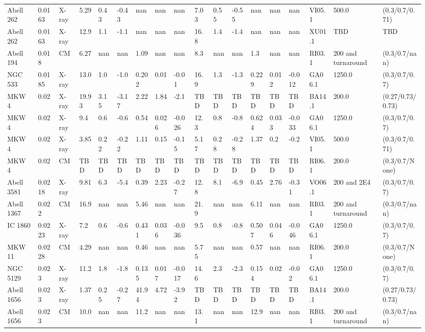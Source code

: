 \documentclass{article}
\begin{document}
\begin{center}
\begin{landscape}
\begin{longtable}{llllllllllllllllll}
Abell 262 & 0.0163 & X-ray & 5.29 & 0.43 & -0.43 & nan & nan & nan & 7.03 & 0.55 & -0.55 & nan & nan & nan & VI05.1 & 500.0 & (0.3/0.7/0.71) \\
Abell 262 & 0.0163 & X-ray & 12.9 & 1.1 & -1.1 & nan & nan & nan & 16.8 & 1.4 & -1.4 & nan & nan & nan & XU01.1 & TBD & TBD \\
Abell 194 & 0.018 & CM & 6.27 & nan & nan & 1.09 & nan & nan & 8.3 & nan & nan & 1.3 & nan & nan & RI03.1 & 200 and turnaround & (0.3/0.7/nan) \\
NGC 533 & 0.0185 & X-ray & 13.0 & 1.0 & -1.0 & 0.202 & 0.01 & -0.01 & 16.9 & 1.3 & -1.3 & 0.229 & 0.012 & -0.012 & GA06.1 & 1250.0 & (0.3/0.7/0.7) \\
MKW 4 & 0.02 & X-ray & 19.93 & 3.15 & -3.17 & 2.22 & 1.84 & -2.1 & TBD & TBD & TBD & TBD & TBD & TBD & BA14.1 & 200.0 & (0.27/0.73/0.73) \\
MKW 4 & 0.02 & X-ray & 9.4 & 0.6 & -0.6 & 0.54 & 0.026 & -0.026 & 12.3 & 0.8 & -0.8 & 0.624 & 0.033 & -0.033 & GA06.1 & 1250.0 & (0.3/0.7/0.7) \\
MKW 4 & 0.02 & X-ray & 3.85 & 0.22 & -0.22 & 1.11 & 0.15 & -0.15 & 5.17 & 0.28 & -0.28 & 1.37 & 0.2 & -0.2 & VI05.1 & 500.0 & (0.3/0.7/0.71) \\
MKW 4 & 0.02 & CM & TBD & TBD & TBD & TBD & TBD & TBD & TBD & TBD & TBD & TBD & TBD & TBD & RI06.1 & 200.0 & (0.3/0.7/None) \\
Abell 3581 & 0.0218 & X-ray & 9.81 & 6.3 & -5.4 & 0.39 & 2.23 & -0.27 & 12.8 & 8.1 & -6.9 & 0.45 & 2.76 & -0.31 & VO06.1 & 200 and 2E4 & (0.3/0.7/0.7) \\
Abell 1367 & 0.022 & CM & 16.9 & nan & nan & 5.46 & nan & nan & 21.9 & nan & nan & 6.11 & nan & nan & RI03.1 & 200 and turnaround & (0.3/0.7/nan) \\
IC 1860 & 0.0223 & X-ray & 7.2 & 0.6 & -0.6 & 0.431 & 0.036 & -0.036 & 9.5 & 0.8 & -0.8 & 0.507 & 0.046 & -0.046 & GA06.1 & 1250.0 & (0.3/0.7/0.7) \\
MKW 11 & 0.0228 & CM & 4.29 & nan & nan & 0.46 & nan & nan & 5.75 & nan & nan & 0.57 & nan & nan & RI06.1 & 200.0 & (0.3/0.7/None) \\
NGC 5129 & 0.023 & X-ray & 11.2 & 1.8 & -1.8 & 0.135 & 0.017 & -0.017 & 14.6 & 2.3 & -2.3 & 0.154 & 0.02 & -0.02 & GA06.1 & 1250.0 & (0.3/0.7/0.7) \\
Abell 1656 & 0.023 & X-ray & 1.37 & 0.25 & -0.27 & 41.94 & 4.72 & -3.92 & TBD & TBD & TBD & TBD & TBD & TBD & BA14.1 & 200.0 & (0.27/0.73/0.73) \\
Abell 1656 & 0.023 & CM & 10.0 & nan & nan & 11.2 & nan & nan & 13.1 & nan & nan & 12.9 & nan & nan & RI03.1 & 200 and turnaround & (0.3/0.7/nan) \\

\end{longtable}
\end{landscape}
\end{center}
\end{document}
